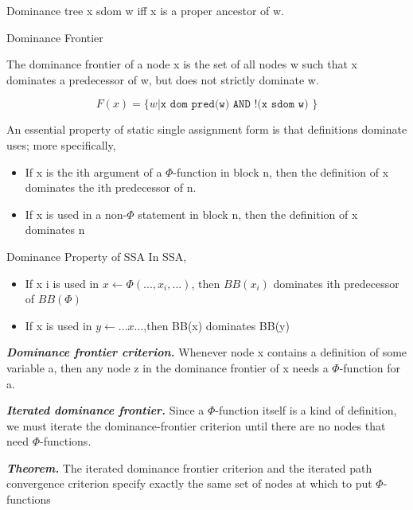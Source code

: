 \begin{definition}{Dominance tree}
	x sdom w iff x is a proper ancestor of w.

\end{definition}

\begin{definition}{Dominance Frontier}


	The dominance frontier of a node x is the set of all nodes w such that
	x dominates a predecessor of w, but does not strictly dominate w.

	$$
		F(x)=  \{w | \texttt{x  dom pred(w) AND   !(x  sdom  w) } \}
	$$
\end{definition}





An essential property of static single assignment form is that definitions dominate uses; more specifically,
\begin{itemize}
	\item  If x is the ith argument of a $\Phi$-function in block n, then the definition of x dominates the ith predecessor of n.
	\item  If x is used in a non-$\Phi$ statement in block n, then the definition of x dominates n
\end{itemize}

\begin{note}{Dominance Property of SSA	}
	In SSA,

	\begin{itemize}
		\item If x i is used in $x \leftarrow \Phi (..., x_i , ...)$, then $BB(x_i )$ dominates ith predecessor of $BB(\Phi)$
		\item If x is used in $y \leftarrow ...x...$,then BB(x) dominates BB(y)
	\end{itemize}
\end{note}


\textbf{ \large \textit{Dominance frontier criterion.}} Whenever node x contains a definition of some variable a, then any node z in the dominance frontier of x needs a $\Phi$-function for a.


\textbf{ \large \textit{Iterated dominance frontier.}} Since a $\Phi$-function itself is a kind of definition, we must iterate the dominance-frontier criterion until there are no nodes that need $\Phi$-functions.


\textbf{ \large \textit{Theorem.}} The iterated dominance frontier criterion and the iterated path convergence criterion specify exactly the same set of nodes at which to put $\Phi$-functions

